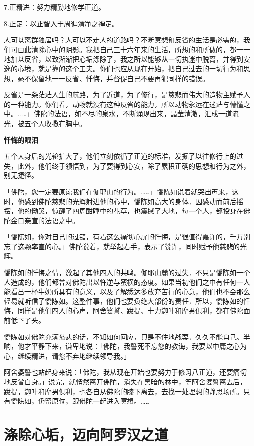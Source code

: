 \documentclass[twoside,openany]{book}
\newcommand{\mt}[1]{\textbullet \textbf{#1}}
\begin{document}
7.正精进：努力精勤地修学正道。

8.正定：以正智入于周徧清净之禅定。

人可以离群独居吗？人可以不走人的道路吗？不断冥想和反省的生活是必需的，我们可由此清除心中的阴影。我把自己三十六年来的生活，所想的和所做的，都一一地加以反省，以致渐渐把心垢涤除了，我之所以能够从一切执迷中脱离，并得到安逸的心境，就是靠的这个工夫。你们也应从现在开始，把自己过去的一切行为和思想，毫不保留地一一反省、忏悔，并督促自己不要再犯同样的错误。

反省是一条茫茫人生的航路，为了近道，为了修行，是慈悲而伟大的造物主赋予人的一种能力。你们看，动物就没有这种反省的能力，所以动物永远在迷茫与懵懂之中。……」佛陀的法语，如不尽的泉水，不断涌现出来，晶莹清澈，汇成一道流光，被五个人收揽在胸中。

\mt{忏悔的眼泪}

五个人身后的光轮扩大了，他们立刻依循了正道的标准，发掘了以往修行上的过失，此外，他们终于领悟到，为了要得到心安，除了累积正确的思想和行为之外，别无捷径。

「佛陀，您一定要原谅我们在伽耶山的行为。……」憍陈如说着就哭出声来，这时，他感到佛陀慈悲的光辉射进他的心中，憍陈如高大的身体，因感动而前后摇摆，他的恸哭，惊醒了四周酣睡中的花草，也震撼了大地，每一个人，都投身在佛陀金口亲宣的法语之中。

「憍陈如，你对自己的过错，有着这么痛彻心扉的忏悔，是很值得嘉许的，千万别忘了这颗率直的心。」佛陀说着，就举起右手，表示了赞许，同时赋予他慈悲的光辉。

憍陈如的忏悔之情，激起了其他四人的共鸣。伽耶山麓的过失，不只是憍陈如一个人造成的，他们都曾对佛陀出以忤逆与蛮横的态度。如果当初他们之中有任何一人能看出一杯牛奶所具有的意义，以及了解悉达多放弃苦行的心意，他们也不会那么轻易就听信了憍陈如。这整件事，他们也要负绝大部份的责任，所以，憍陈如的忏悔，同样是他们四人的心声，阿舍婆誓、跋提、十力迦叶和摩男俱利，都在佛陀面前低下了头。

憍陈如对佛陀充满慈悲的话，不知如何回应，只是不住地战栗，久久不能自己。半晌，他才平静下来，谦卑地说：「佛陀，我誓死不忘您的教诲，我要以中庸之心为心，继续精进，请您不弃地继续领导我。」

阿舍婆誓也站起身来说：「佛陀，我从现在开始也要努力于修习八正道，还要痛切地反省自身。」说完，就悄然离开佛陀，消失在黑暗的林中，等阿舍婆誓离去后，跋提，迦叶和摩男俱利，也各自从佛陀的膝下离去，去找一处理想的静思场所。只有憍陈如，仍留原位，跟佛陀一起进入冥想。……

\section{涤除心垢，迈向阿罗汉之道}\label{sec2.6}
\end{document}

